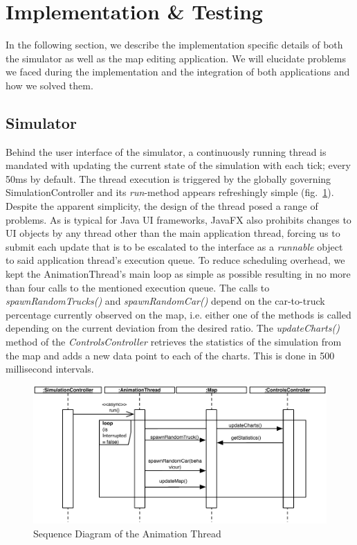 \section{Implementation \& Testing}
In the following section, we describe the implementation specific details of both the simulator as well as the map editing application. We will elucidate problems we faced during the implementation and the integration of both applications and how we solved them. 
\subsection{Simulator}
Behind the user interface of the simulator, a continuously running thread is mandated with updating the current state of the simulation with each tick; every 50ms by default. The thread execution is triggered by the globally governing SimulationController and its \textit{run}-method appears refreshingly simple (fig.~\ref{fig:animthread}). Despite the apparent simplicity, the design of the thread posed a range of problems. As is typical for Java UI frameworks, JavaFX also prohibits changes to UI objects by any thread other than the main application thread, forcing us to submit each update that is to be escalated to the interface as a \textit{runnable} object to said application thread's execution queue. To reduce scheduling overhead, we kept the AnimationThread's main loop as simple as possible resulting in no more than four calls to the mentioned execution queue. The calls to \textit{spawnRandomTrucks()} and \textit{spawnRandomCar()} depend on the car-to-truck percentage currently observed on the map, i.e. either one of the methods is called depending on the current deviation from the desired ratio. The \textit{updateCharts()} method of the \textit{ControlsController} retrieves the statistics of the simulation from the map and adds a new data point to each of the charts. This is done in 500 millisecond intervals.

\begin{figure}[h]
	\begin{center}
		\includegraphics[width=\textwidth]{img/SD_animThread.pdf}
		\caption[Sequence Diagram of the Animation Thread]{Sequence Diagram of the Animation Thread}
		\label{fig:animthread}
	\end{center}

\end{figure}

